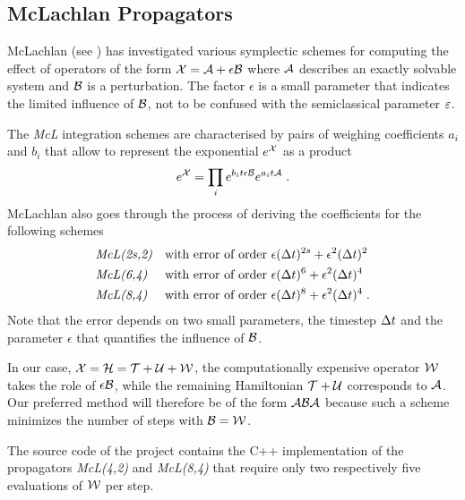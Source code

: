 \subsection{McLachlan Propagators}
\label{sub:mcl_propagator}
%
McLachlan (see \cite{McLachlan1995}) has investigated various symplectic schemes for computing the effect of operators of the form $\mathcal{X} = \mathcal{A} + \epsilon \mathcal{B}$ where $\mathcal{A}$ describes an exactly solvable system and $\mathcal{B}$ is a perturbation.
The factor $\epsilon$ is a small parameter that indicates the limited influence of $\mathcal{B}$, not to be confused with the semiclassical parameter $\varepsilon$.
\par\medskip
The \emph{McL} integration schemes are characterised by pairs of weighing coefficients $a_i$ and $b_i$ that allow to represent the exponential $e^{\mathcal{X}}$ as a product
%
\begin{align}
	e^{\mathcal{X}} = \prod_i e^{b_i t \epsilon \mathcal{B}} e^{a_i t \mathcal{A}} \; .
\end{align}
%
McLachlan also goes through the process of deriving the coefficients for the following schemes
\begin{align*}
	&\text{\emph{McL(2s,2)}} &&\text{with error of order } \epsilon (\Delta t)^{2s} + \epsilon^2 (\Delta t)^2 \\
	&\text{\emph{McL(6,4)}} &&\text{with error of order } \epsilon (\Delta t)^{6} + \epsilon^2 (\Delta t)^4 \\
	&\text{\emph{McL(8,4)}} &&\text{with error of order } \epsilon (\Delta t)^{8} + \epsilon^2 (\Delta t)^4 \; .
\end{align*}
%
Note that the error depends on two small parameters, the timestep $\Delta t$ and the parameter $\epsilon$ that quantifies the influence of $\mathcal{B}$.
\par\medskip
%
In our case, $\mathcal{X} = \mathcal{H} = \mathcal{T} + \mathcal{U} + \mathcal{W}$, the computationally expensive operator $\mathcal{W}$ takes the role of $\epsilon \mathcal{B}$, while the remaining Hamiltonian $\mathcal{T} + \mathcal{U}$ corresponds to $\mathcal{A}$. 
Our preferred method will therefore be of the form $\mathcal{A} \mathcal{B} \mathcal{A}$ because such a scheme minimizes the number of steps with $\mathcal{B} = \mathcal{W}$.
\par\medskip
%
The source code of the project contains the C++ implementation of the propagators \emph{McL(4,2)} and \emph{McL(8,4)} that require only two respectively five evaluations of $\mathcal{W}$ per step.

